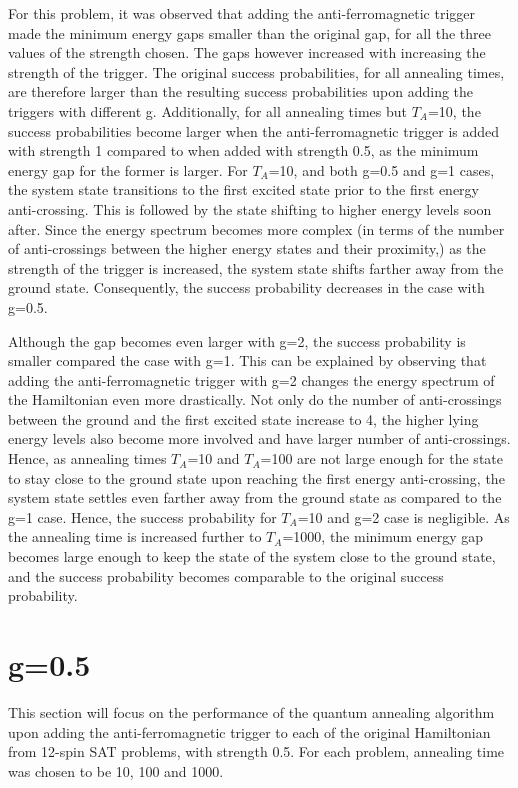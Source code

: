 \documentclass[../main.tex]{subfiles}
\begin{document}
For this problem, it was observed that adding the anti-ferromagnetic trigger made the minimum energy gaps smaller than the original gap, for all the three values of the strength chosen. The gaps however increased with increasing the strength of the trigger. The original success probabilities, for all annealing times, are therefore larger than the resulting success probabilities upon adding the triggers with different g. Additionally, for all annealing times but $T_A$=10, the success probabilities become larger when the anti-ferromagnetic trigger is added with strength 1 compared to when added with strength 0.5, as the minimum energy gap for the former is larger. For $T_A$=10, and both g=0.5 and g=1 cases, the system state transitions to the first excited state prior to the first energy anti-crossing. This is followed by the state shifting to higher energy levels soon after. Since the energy spectrum becomes more complex (in terms of the number of anti-crossings between the higher energy states and their proximity,) as the strength of the trigger is increased, the system state shifts farther away from the ground state. Consequently, the success probability decreases in the case with g=0.5.

 Although the gap becomes even larger with g=2, the success probability is smaller compared the case with g=1. This can be explained by observing that adding the anti-ferromagnetic trigger with g=2 changes the energy spectrum of the Hamiltonian even more drastically. Not only do the number of anti-crossings between the ground and the first excited state increase to 4, the higher lying energy levels also become more involved and have larger number of anti-crossings. Hence, as annealing times $T_A$=10 and $T_A$=100 are not large enough for the state to stay close to the ground state upon reaching the first energy anti-crossing, the system state settles even farther away from the ground state as compared to the g=1 case. Hence, the success probability for $T_A$=10 and g=2 case is negligible. As the annealing time is increased further to $T_A$=1000, the minimum energy gap becomes large enough to keep the state of the system close to the ground state, and the success probability becomes comparable to the original success probability.
 
 
\section*{g=0.5}
This section will focus on the performance of the quantum annealing algorithm upon adding the anti-ferromagnetic trigger to each of the original Hamiltonian from 12-spin SAT problems, with strength 0.5. For each problem, annealing time was chosen to be 10, 100 and 1000. 
\end{document}
